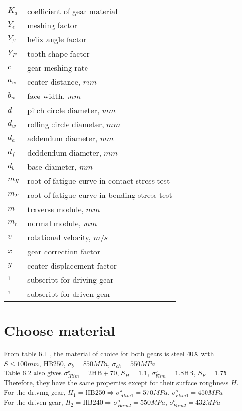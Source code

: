 \begin{tabular}[t]{lp{7cm}}
	$ K_d $ & coefficient of gear material\\
	$ Y_\epsilon $ & meshing factor\\
	$ Y_\beta $ & helix angle factor\\
	$ Y_F $ & tooth shape factor\\
	$ c $ & gear meshing rate\\
	$ a_w $ & center distance, $ mm $\\
	$ b_w $ & face width, $ mm $\\
	$ d $ & pitch circle diameter, $ mm $\\
	$ d_w $ & rolling circle diameter, $ mm $\\
	$ d_a $ & addendum diameter, $ mm $\\
	$ d_f $ & deddendum diameter, $ mm $\\
	$ d_b $ & base diameter, $ mm $\\
	$ m_H $ & root of fatigue curve in contact stress test\\
	$ m_F $ & root of fatigue curve in bending stress test\\
	$ m $ & traverse module, $ mm $\\
	$ m_n $ & normal module, $ mm $\\
	$ v $ & rotational velocity, $ m/s $\\
	$ x $ & gear correction factor\\
	$ y $ & center displacement factor\\
	$ _1 $ & subscript for driving gear\\
	$ _2 $ & subscript for driven gear
\end{tabular}

\section{Choose material}
From table 6.1 , the material of choice for both gears is steel 40X with $ S\leq100\unit{mm} $, $ \text{HB} 250 $, $ \sigma_b = 850\unit{MPa} $, $ \sigma_{ch} = 550 \unit{MPa}$.\\
Table 6.2  also gives $ \sigma_{Hlim}^o = 2\text{HB} + 70$, $ S_H = 1.1 $, $ \sigma_{Flim}^o = 1.8\text{HB} $, $ S_F = 1.75 $\\
Therefore, they have the same properties except for their surface roughness $ H $.\\
For the driving gear, $ H_1=\text{HB}250 \Rightarrow \sigma_{Hlim1}^o = 570\unit{MPa}$, $ \sigma_{Flim1}^o = 450\unit{MPa}$\\
For the driven gear, $ H_2=\text{HB}240 \Rightarrow \sigma_{Hlim2}^o = 550\unit{MPa}$, $ \sigma_{Flim2}^o = 432\unit{MPa}$

